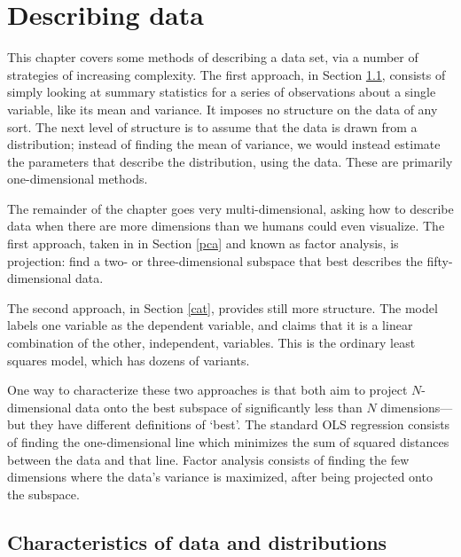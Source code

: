 \chapter{Describing data} \label{projections}
\def\xv{{\bf x} } \def\yv{{\bf y} } \def\pv{{\bf p} }
\def\Iv{{\bf I}}\def\Sv{{\bf S}}\def\yv{{\bf y}}\def\Zv{{\bf Z}} \def\cv{{\bf c}} \def\uv{{\bf u}} \def\Yv{{\bf Y}} \def\Xv{{\bf X}} \def\Qv{{\bf Q}}
\def\betav{{\mbox{\boldmath$\beta$}}}
\def\vector#1{\left[\matrix{#1}\right]}

This chapter covers some methods of describing a data set, via a
number of strategies of increasing complexity. 
The first approach, in Section \ref{basicstats}, consists of simply looking
at summary statistics for a series of observations about a single
variable, like its mean and variance. It imposes no structure on the
data of any sort. The next level of structure is to
assume that the data is drawn from a distribution; instead of finding
the mean of variance, we would instead estimate the parameters that
describe the distribution, using the data. These are primarily
one-dimensional methods.

The remainder of the chapter goes very multi-dimensional, asking how
to describe data when there are more dimensions than we humans could
even visualize. The first approach, taken in in Section \ref{pca} and
known as factor analysis,
is projection: find a two- or three-dimensional subspace that best
describes the fifty-dimensional data. 

The second approach, in Section \ref{cat}, provides still more
structure. The model labels one variable as the dependent variable, and claims
that it is a linear combination of the other, independent, variables.
This is the ordinary least squares model, which has dozens of variants.

One way to characterize these two approaches is that both aim to project
$N$-dimensional data onto the best subspace of significantly less than
$N$ dimensions---but they have different definitions of `best'.
The standard OLS regression consists of
finding the one-dimensional line which minimizes the sum of squared
distances between the data and that line. Factor analysis consists
of finding the few dimensions where the data's variance is maximized, after being
projected onto the subspace.



\section{Characteristics of data and distributions}\label{basicstats}

